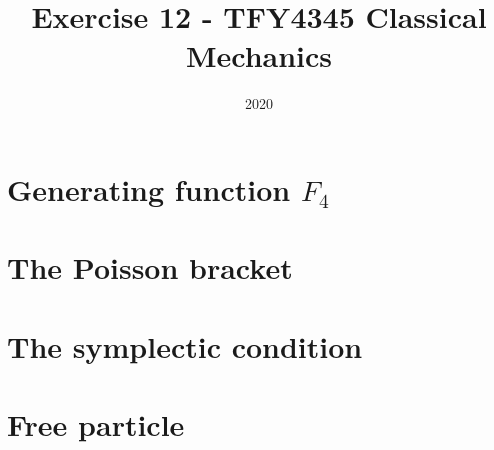 \documentclass{article}
\title{Exercise 12 - TFY4345 Classical Mechanics}
\date{2020}
\begin{document}
    \maketitle
    \section{Generating function $F_4$}
        
    \section{The Poisson bracket}
 
    \section{The symplectic condition}
 
    \section{Free particle}
 
\end{document}
